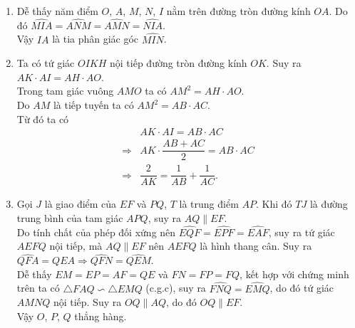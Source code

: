 \begin{ex}
{\begin{center}
\end{center}
\begin{enumerate}
\item Dễ thấy năm điểm $O$, $A$, $M$, $N$, $I$ nằm trên đường tròn đường kính $OA$. Do đó $\widehat{MIA}=\widehat{ANM}=\widehat{AMN}=\widehat{NIA}$.\\
Vậy $IA$ là tia phân giác góc $\widehat{MIN}$.
\item Ta có tứ giác $OIKH$ nội tiếp đường tròn đường kính $OK$. Suy ra $AK\cdot AI= AH\cdot AO$.\\
Trong tam giác vuông $AMO$ ta có $AM^2=AH\cdot AO$.\\
Do $AM$ là tiếp tuyến ta có $AM^2=AB \cdot AC$.\\
Từ đó ta có 
\begin{align*}
&AK\cdot AI= AB\cdot AC\\
\Rightarrow &AK\cdot \dfrac{AB+AC}{2}=AB\cdot AC\\
\Rightarrow &\dfrac{2}{AK}=\dfrac{1}{AB} + \dfrac{1}{AC}.
\end{align*}
\item Gọi $J$ là giao điểm của $EF$ và $PQ$, $T$ là trung điểm $AP$. Khi đó $TJ$ là đường trung bình của tam giác $APQ$, suy ra $AQ\parallel EF$.\\
Do tính chất của phép đối xứng nên $\widehat{EQF}=\widehat{EPF}=\widehat{EAF}$, suy ra tứ giác $AEFQ$ nội tiếp, mà $AQ\parallel EF$ nên $AEFQ$ là hình thang cân. Suy ra $\widehat{QFA}=\widehat{QEA} \Rightarrow \widehat{QFN}=\widehat{QEM}$.\\
Dễ thấy $EM=EP=AF=QE$ và $FN=FP=FQ$, kết hợp với chứng minh trên ta có $\triangle FAQ \backsim \triangle EMQ$ (c.g.c), suy ra $\widehat{FNQ}=\widehat{EMQ}$, do đó tứ giác $AMNQ$ nội tiếp. Suy ra $OQ\parallel AQ$, do đó $OQ \parallel EF$.\\
Vậy $O$, $P$, $Q$ thẳng hàng.
\end{enumerate}
}
\end{ex}

